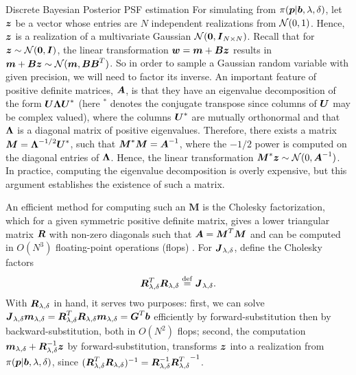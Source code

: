 \begin{chapter}{Discrete Bayesian Posterior PSF estimation}
For simulating from $\pi(\mbox{\boldmath$p$}|\mbox{\boldmath$b$}, \lambda,\delta)$, let $\mbox{\boldmath$z$}$ be a vector whose entries are $N$ independent realizations from $\mathcal{N}(0,1)$. 
Hence, $\mbox{\boldmath$z$}$ is a realization of a multivariate Gaussian $\mathcal{N}(\mbox{\boldmath$0$},\mbox{\boldmath$I$}_{N\times N})$.
Recall that for $\mbox{\boldmath$z$} \sim \mathcal{N}(\mbox{\boldmath$0$},\mbox{\boldmath$I$})$, the linear transformation $\mbox{\boldmath$w$} = \mbox{\boldmath$m$} + \mbox{\boldmath$B$}\mbox{\boldmath$z$}$ results in $\mbox{\boldmath$m$} + \mbox{\boldmath$B$} \mbox{\boldmath$z$} \sim \mathcal{N}(\mbox{\boldmath$m$}, \mbox{\boldmath$B$}\mbox{\boldmath$B$}^T)$. 
So in order to sample a Gaussian random variable with given precision, we will need to factor its inverse.
An important feature of positive definite matrices, $\mbox{\boldmath$A$}$, is that they have an eigenvalue decomposition of the form $\mbox{\boldmath$U$} \mbox{\boldmath$\Lambda$} \mbox{\boldmath$U$}^*$ (here $^*$ denotes the conjugate transpose since columns of $\mbox{\boldmath$U$}$ may be complex valued), where the columns $\mbox{\boldmath$U$}^*$ are mutually orthonormal and that $\mbox{\boldmath$\Lambda$}$ is a diagonal matrix of positive eigenvalues.
Therefore, there exists a matrix $\mbox{\boldmath$M$} =  \mbox{\boldmath$\Lambda$}^{-1/2} \mbox{\boldmath$U$}^*$, such that $\mbox{\boldmath$M$}^*\mbox{\boldmath$M$} = \mbox{\boldmath$A$}^{-1}$, where the $-1/2$ power is computed on the diagonal entries of $\mbox{\boldmath$\Lambda$}$.
Hence, the linear transformation $\mbox{\boldmath$M$}^* \mbox{\boldmath$z$} \sim \mathcal{N}(0,\mbox{\boldmath$A$}^{-1})$.  
In practice, computing the eigenvalue decomposition is overly expensive, but this argument establishes the existence of such a matrix.

An efficient method for computing such an $\bm M$ is the Cholesky factorization, which for a given symmetric positive definite matrix, gives a lower triangular matrix $\mbox{\boldmath$R$}$ with non-zero diagonals such that $\mbox{\boldmath$A$} = \mbox{\boldmath$M$}^T\mbox{\boldmath$M$}$ and can be computed in $O(N^3)$ floating-point operations (flops) \citep{golub2012matrix}.
For $\mbox{\boldmath$J$}_{\lambda,\delta}$, define the Cholesky factors
\begin{equation} \label{eq:choleskyJ}
  \mbox{\boldmath$R$}_{\lambda,\delta}^T\mbox{\boldmath$R$}_{\lambda,\delta} \stackrel{\rm def}{=} \mbox{\boldmath$J$}_{\lambda,\delta}.
\end{equation}
With $\mbox{\boldmath$R$}_{\lambda,\delta}$ in hand, it serves two purposes: first, we can solve $\mbox{\boldmath$J$}_{\lambda,\delta} \mbox{\boldmath$m$}_{\lambda,\delta} = \mbox{\boldmath$R$}_{\lambda,\delta}^T\mbox{\boldmath$R$}_{\lambda,\delta} \mbox{\boldmath$m$}_{\lambda,\delta} = \mbox{\boldmath$G$}^T \mbox{\boldmath$b$}$ efficiently by forward-substitution then by backward-substitution, both in $O(N^2)$ flops; second, the computation $\mbox{\boldmath$m$}_{\lambda,\delta} + \mbox{\boldmath$R$}_{\lambda,\delta}^{-1} \mbox{\boldmath$z$}$ by forward-substitution, transforms $\mbox{\boldmath$z$}$ into a realization from $\pi(\mbox{\boldmath$p$} | \mbox{\boldmath$b$},\lambda,\delta)$,
since $(\mbox{\boldmath$R$}_{\lambda,\delta}^T \mbox{\boldmath$R$}_{\lambda,\delta})^{-1} =\mbox{\boldmath$R$}_{\lambda,\delta}^{-1} {\mbox{\boldmath$R$}_{\lambda,\delta}^T}^{-1}$.


\end{chapter}
